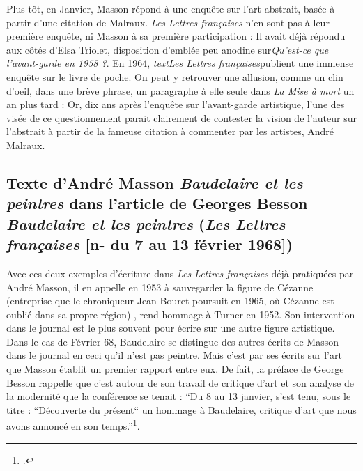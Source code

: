 	Plus tôt, en Janvier, Masson répond à une enquête sur l’art abstrait, basée à partir d’une citation de Malraux. \emph{Les Lettres françaises} n’en sont pas à leur première enquête, ni Masson à sa première participation : Il avait déjà répondu aux côtés d’Elsa Triolet, disposition d’emblée peu anodine sur\emph{Qu’est-ce que l’avant-garde en 1958 ?}. En 1964, \emph{textLes Lettres françaises}publient une immense enquête sur le livre de poche. On peut y retrouver une allusion, comme un clin d’oeil, dans une brève phrase, un paragraphe à elle seule dans \emph{La Mise à mort} un an plus tard : Or, dix ans après l’enquête sur l’avant-garde artistique, l’une des visée de ce questionnement parait clairement de contester la vision de l’auteur sur l’abstrait à partir  de la fameuse citation à commenter par les artistes, André Malraux. 

\subsection{Texte d'André Masson \emph{Baudelaire et les peintres} dans l'article de Georges Besson \emph{Baudelaire et les peintres} (\emph{Les Lettres françaises} [n- du 7 au 13 février 1968]) }


Avec ces deux exemples d’écriture dans \emph{Les Lettres françaises} déjà pratiquées par André Masson, il en appelle en 1953 à sauvegarder la figure de Cézanne (entreprise que le chroniqueur Jean Bouret poursuit en 1965, où Cézanne est oublié dans sa propre région) , rend hommage à Turner en 1952. Son intervention dans le journal est le plus souvent pour écrire sur une autre figure artistique. Dans le cas de Février 68, Baudelaire se distingue des autres écrits de Masson dans le journal en ceci qu’il n’est pas peintre. Mais c’est par ses écrits sur l’art que Masson établit un premier rapport entre eux. De fait, la préface de George Besson rappelle que c’est autour de son travail de critique d’art et son analyse de la modernité que la conférence se tenait : \enquote{Du 8 au 13 janvier, s’est tenu, sous le titre :  “Découverte du présent“ un hommage à Baudelaire, critique d’art que nous avons annoncé en son temps.}\footcite{baudelairepeintres}.



